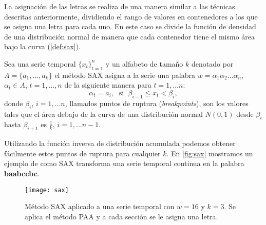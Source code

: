 La asignación de las letras se realiza de una manera similar a las técnicas descritas anteriormente, dividiendo el rango de valores en contenedores a los que se asigna una letra para cada uno. En este caso se divide la función de densidad de una distribución normal de manera que cada contenedor tiene el mismo área bajo la curva (\autoref{def:sax}).

\begin{definicion}[SAX]
  Sea una serie temporal $\{x_t\}_{t = 1}^n$ y un alfabeto de tamaño $k$ denotado por $A = \{a_1, \ldots, a_k\}$ el método SAX asigna a la serie una palabra $w = \alpha_1\alpha_2\ldots\alpha_n$, $\alpha_t \in A, \, t = 1, \ldots, n$ de la siguiente manera para $t = 1, \ldots n$:
  $$\alpha_t = a_i, \; \text{ si } \; \beta_{i-1} \leq x_t < \beta_i,$$
  donde $\beta_i$, $i = 1, \ldots n$, llamados puntos de ruptura (\emph{breakpoints}), son los valores tales que el área debajo de la curva de una distribución normal $N(0,1)$ desde $\beta_i$ hasta $\beta_{i+1}$ es $\frac{1}{k}$, $i = 1, \ldots n-1$.
  \label{def:sax}
\end{definicion}

Utilizando la función inversa de distribución acumulada podemos obtener fácilmente estos puntos de ruptura para cualquier $k$. En \autoref{fig:sax} \cite{lin2007experiencing} mostramos un ejemplo de como SAX transforma una serie temporal continua en la palabra \textbf{baabccbc}.

\begin{figure}[htpb]
  \centering
  \texttt{[image: sax]}
  \caption{Método SAX aplicado a una serie temporal con $w = 16$ y $k = 3$. Se aplica el método PAA y a cada sección se le asigna una letra.}
  \label{fig:sax}
\end{figure}

\endinput
